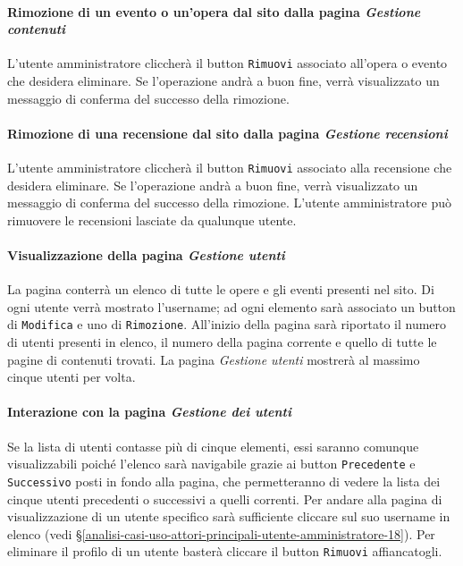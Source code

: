 \paragraph{Rimozione di un evento o un'opera dal sito dalla pagina \textit{Gestione contenuti}}
\label{analisi-casi-uso-attori-principali-utente-amministratore-14}
L'utente amministratore cliccherà il button \texttt{Rimuovi} associato all'opera o evento che desidera eliminare. Se l'operazione andrà a buon fine, verrà visualizzato un messaggio di conferma del successo della rimozione.


\paragraph{Rimozione di una recensione dal sito dalla pagina \textit{Gestione recensioni}}
\label{analisi-casi-uso-attori-principali-utente-amministratore-15}
L'utente amministratore cliccherà il button \texttt{Rimuovi} associato alla recensione che desidera eliminare. Se l'operazione andrà a buon fine, verrà visualizzato un messaggio di conferma del successo della rimozione. L'utente amministratore può rimuovere le recensioni lasciate da qualunque utente.


\paragraph{Visualizzazione della pagina \textit{Gestione utenti}}
\label{analisi-casi-uso-attori-principali-utente-amministratore-16}
La pagina conterrà un elenco di tutte le opere e gli eventi presenti nel sito. Di ogni utente verrà mostrato l'username; ad ogni elemento sarà associato un button di \texttt{Modifica} e uno di \texttt{Rimozione}. All'inizio della pagina sarà riportato il numero di utenti presenti in elenco, il numero della pagina corrente e quello di tutte le pagine di contenuti trovati. La pagina \textit{Gestione utenti} mostrerà al massimo cinque utenti per volta.


\paragraph{Interazione con la pagina \textit{Gestione dei utenti}}
\label{analisi-casi-uso-attori-principali-utente-amministratore-17}
Se la lista di utenti contasse più di cinque elementi, essi saranno comunque visualizzabili poiché l'elenco sarà navigabile grazie ai button \texttt{Precedente} e \texttt{Successivo} posti in fondo alla pagina, che permetteranno di vedere la lista dei cinque utenti precedenti o successivi a quelli correnti. Per andare alla pagina di visualizzazione di un utente specifico sarà sufficiente cliccare sul suo username in elenco (vedi §\ref{analisi-casi-uso-attori-principali-utente-amministratore-18}). Per eliminare il profilo di un utente basterà cliccare il button \texttt{Rimuovi} affiancatogli.


